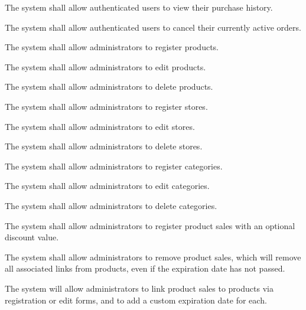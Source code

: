 {
The system shall allow authenticated users to view their purchase history.
}

{
The system shall allow authenticated users to cancel their currently active orders.
}

{
The system shall allow administrators to register products.
}

{
The system shall allow administrators to edit products.
}

{
The system shall allow administrators to delete products.
}

{
The system shall allow administrators to register stores.
}

{
The system shall allow administrators to edit stores.
}

{
The system shall allow administrators to delete stores.
}

{
The system shall allow administrators to register categories.
}

{
The system shall allow administrators to edit categories.
}

{
The system shall allow administrators to delete categories.
}

{
The system shall allow administrators to register product sales with an optional discount value.
}

{
The system shall allow administrators to remove product sales, which will remove all associated links from products, even if the expiration date has not passed.
}

{
The system will allow administrators to link product sales to products via registration or edit forms, and to add a custom expiration date for each.
}
